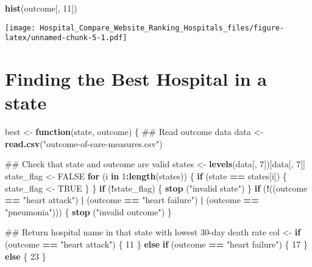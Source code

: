 \documentclass[]{article}
\newenvironment{Shaded}{\begin{snugshade}}{\end{snugshade}}
\newcommand{\KeywordTok}[1]{\textcolor[rgb]{0.13,0.29,0.53}{\textbf{#1}}}
\newcommand{\DecValTok}[1]{\textcolor[rgb]{0.00,0.00,0.81}{#1}}
\newcommand{\StringTok}[1]{\textcolor[rgb]{0.31,0.60,0.02}{#1}}
\newcommand{\OtherTok}[1]{\textcolor[rgb]{0.56,0.35,0.01}{#1}}
\newcommand{\ControlFlowTok}[1]{\textcolor[rgb]{0.13,0.29,0.53}{\textbf{#1}}}
\newcommand{\OperatorTok}[1]{\textcolor[rgb]{0.81,0.36,0.00}{\textbf{#1}}}
\newcommand{\NormalTok}[1]{#1}
\begin{document}
\begin{Shaded}
\begin{Highlighting}[]
\KeywordTok{hist}\NormalTok{(outcome[, }\DecValTok{11}\NormalTok{])}
\end{Highlighting}
\end{Shaded}

\texttt{[image: Hospital\_Compare\_Website\_Ranking\_Hospitals\_files/figure-latex/unnamed-chunk-5-1.pdf]}

\section{Finding the Best Hospital in a
state}\label{finding-the-best-hospital-in-a-state}

\begin{Shaded}
\begin{Highlighting}[]
\NormalTok{best <-}\StringTok{ }\ControlFlowTok{function}\NormalTok{(state, outcome) \{}
\NormalTok{        ## Read outcome data}
\NormalTok{        data <-}\StringTok{ }\KeywordTok{read.csv}\NormalTok{(}\StringTok{"outcome-of-care-measures.csv"}\NormalTok{)}
        
\NormalTok{        ## Check that state and outcome are valid}
\NormalTok{        states <-}\StringTok{ }\KeywordTok{levels}\NormalTok{(data[, }\DecValTok{7}\NormalTok{])[data[, }\DecValTok{7}\NormalTok{]]}
\NormalTok{        state_flag <-}\StringTok{ }\OtherTok{FALSE}
        \ControlFlowTok{for}\NormalTok{ (i }\ControlFlowTok{in} \DecValTok{1}\OperatorTok{:}\KeywordTok{length}\NormalTok{(states)) \{}
                \ControlFlowTok{if}\NormalTok{ (state }\OperatorTok{==}\StringTok{ }\NormalTok{states[i]) \{}
\NormalTok{                        state_flag <-}\StringTok{ }\OtherTok{TRUE}
\NormalTok{                \}}
\NormalTok{        \}}
        \ControlFlowTok{if}\NormalTok{ (}\OperatorTok{!}\NormalTok{state_flag) \{}
                \KeywordTok{stop}\NormalTok{ (}\StringTok{"invalid state"}\NormalTok{)}
\NormalTok{        \} }
        \ControlFlowTok{if}\NormalTok{ (}\OperatorTok{!}\NormalTok{((outcome }\OperatorTok{==}\StringTok{ "heart attack"}\NormalTok{) }\OperatorTok{|}\StringTok{ }\NormalTok{(outcome }\OperatorTok{==}\StringTok{ "heart failure"}\NormalTok{)}
            \OperatorTok{|}\StringTok{ }\NormalTok{(outcome }\OperatorTok{==}\StringTok{ "pneumonia"}\NormalTok{))) \{}
                \KeywordTok{stop}\NormalTok{ (}\StringTok{"invalid outcome"}\NormalTok{)}
\NormalTok{        \}}
        
\NormalTok{        ## Return hospital name in that state with lowest 30-day death rate}
\NormalTok{        col <-}\StringTok{ }\ControlFlowTok{if}\NormalTok{ (outcome }\OperatorTok{==}\StringTok{ "heart attack"}\NormalTok{) \{}
                \DecValTok{11}
\NormalTok{        \} }\ControlFlowTok{else} \ControlFlowTok{if}\NormalTok{ (outcome }\OperatorTok{==}\StringTok{ "heart failure"}\NormalTok{) \{}
                \DecValTok{17}
\NormalTok{        \} }\ControlFlowTok{else}\NormalTok{ \{}
                \DecValTok{23}
\NormalTok{        \}}
        

\end{Highlighting}
\end{Shaded}
\end{document}
